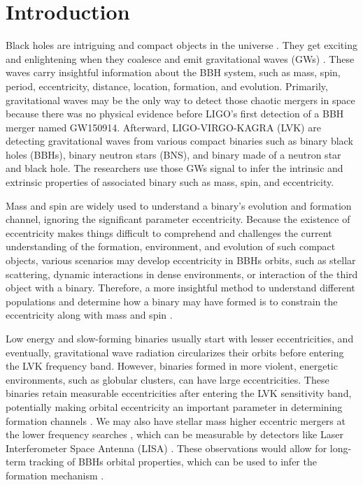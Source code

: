 \documentclass[twocolumn,prd,nofootinbib]{revtex4}
\begin{document}
\section{Introduction}
Black holes are intriguing and compact objects in the universe \cite{Frolic_BH_Book_2011}. They get exciting and enlightening when they coalesce and emit gravitational waves (GWs) \cite{Frolic_BH_Book_2011, Indrajit_GW_intro_1999}. These waves carry insightful information about the BBH system, such as mass, spin, period, eccentricity, distance, location, formation, and evolution. Primarily, gravitational waves may be the only way to detect those chaotic mergers in space because there was no physical evidence before LIGO's \cite{LIGO_2015} first detection of a BBH merger named GW150914. Afterward, LIGO-VIRGO-KAGRA (LVK) \cite{LIGO_2015, VIRGO_2012, Virgo-2015,kagra-2013} are detecting gravitational waves from various compact binaries such as binary black holes (BBHs), binary neutron stars (BNS), and binary made of a neutron star and black hole. The researchers use those GWs signal to infer the intrinsic and extrinsic properties of associated binary such as mass, spin, and eccentricity.  

Mass and spin are widely used to understand a binary's evolution and formation channel, ignoring the significant parameter eccentricity. Because the existence of eccentricity makes things difficult to comprehend and challenges the current understanding of the formation, environment, and evolution of such compact objects, various scenarios may develop eccentricity in BBHs orbits, such as stellar scattering, dynamic interactions in dense environments, or interaction of the third object with a binary. Therefore, a more insightful method to understand different populations and determine how a binary may have formed is to constrain the eccentricity along with mass and spin \cite{Rod-2018, zevin-samsing-2019, samsing-2018, Rodriguez-2018, Antonini-2014}.  

Low energy and slow-forming binaries usually start with lesser eccentricities, and eventually, gravitational wave radiation circularizes their orbits \cite{Peters-1964} before entering the LVK frequency band. However, binaries formed in more violent, energetic environments, such as globular clusters, can have large eccentricities. These binaries retain measurable eccentricities after entering the LVK sensitivity band, potentially making orbital eccentricity an important parameter in determining formation channels \cite{Rod-2018,zevin-samsing-2019,samsing-2018, Rodriguez-2018,Antonini-2014}. We may also have stellar mass higher eccentric mergers at the lower frequency searches \cite{sesana-2016,chen-2017}, which can be measurable by detectors like Laser Interferometer Space Antenna (LISA) \cite{LISA-2017}. These observations would allow for long-term tracking of BBHs orbital properties, which can be used to infer the formation mechanism \cite{Breivik-2016}.
\end{document}
